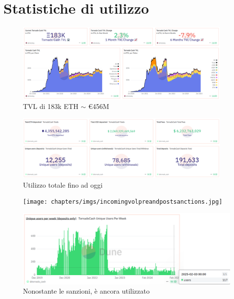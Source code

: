 \section{Statistiche di utilizzo}
\cite{dune}\cite{trmlabs_tornado_cash}

\begin{figure}[H]
    \centering
    \includegraphics[width=0.95\textwidth]{chapters/imgs/tornadocashdunestatisticstvl.png}  
    \caption{TVL di 183k ETH $\sim$ €456M}
\end{figure}

\begin{figure}[H]
    \centering
    \includegraphics[width=0.95\textwidth]{chapters/imgs/tornadocashdunestatisticsdepositswithdrawals.png}
    \caption{Utilizzo totale fino ad oggi}
\end{figure}

\begin{figure}[H]
    \centering
    \begin{minipage}{0.6\textwidth}
        \centering
        \texttt{[image: chapters/imgs/incomingvolpreandpostsanctions.jpg]}
    \end{minipage}
    \hspace{0.04\textwidth}
    \begin{minipage}{0.6\textwidth}
        \centering
        \includegraphics[width=\textwidth]{chapters/imgs/tornadocashdunestatisticsdepositsuniqueperweek.png}
    \end{minipage}
    \caption{Nonostante le sanzioni, è ancora utilizzato}
\end{figure}

